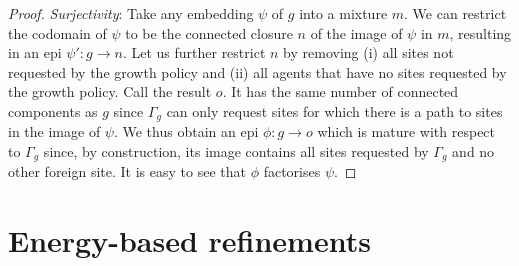 \documentclass[a4paper,12pt]{article}
\newcommand{\gp}{\Gamma}
\begin{document}
\begin{proof}
  \emph{Surjectivity}:
  Take any embedding $\psi$ of $g$ into a mixture $m$.
  We can restrict the codomain of $\psi$ to be
  the connected closure $n$ of the image of $\psi$ in $m$,
  resulting in an epi $\psi': g \to n$.
  Let us further restrict $n$ by removing
  (i) all sites not requested by the growth policy and
  (ii) all agents that have no sites requested by the growth policy.
  Call the result $o$.
  It has the same number of connected components as $g$
  since $\gp_g$ can only request sites
  for which there is a path to sites in the image of $\psi$.
  We thus obtain an epi $\phi: g \to o$
  which is mature with respect to $\gp_g$ since,
  by construction, its image contains all sites
  requested by $\gp_g$ and no other foreign site.
  It is easy to see that $\phi$ factorises $\psi$.
\end{proof}


\pagebreak
\section{Energy-based refinements}
\end{document}
